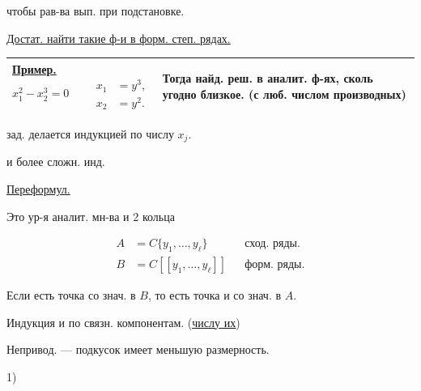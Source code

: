 чтобы рав-ва вып. при подстановке.

\underline{Достат. найти такие ф-и в форм. степ. рядах.}

\noindent\begin{tabular}{@{}p{.44\linewidth}|p{.48\linewidth}@{}}
\underline{Пример.}
\begin{equation*}x_1^2-x_2^3=0\qquad\begin{aligned}x_1&=y^3,\\x_2&=y^2.\end{aligned}\end{equation*}
& Тогда найд. реш. в аналит. ф-ях, сколь угодно близкое. (с люб. числом производных)\\\hline
\end{tabular}





зад. делается индукцией по числу $x_j$.

и более сложн. инд.

\underline{Переформул.}

Это ур-я аналит. мн-ва и 2 кольца

\begin{align*}
A&=C\{y_1,\ldots,y_\ell\}&&\text{сход. ряды.}\\
B&=C[[y_1,\ldots,y_\ell]]&&\text{форм. ряды.}
\end{align*}

Если  есть точка со знач. в $B$, то есть точка и со знач. в $A$.







Индукция и по связн. компонентам. (\underline{\underline{числу их}})

Непривод. --- подкусок имеет меньшую размерность.

1) 





